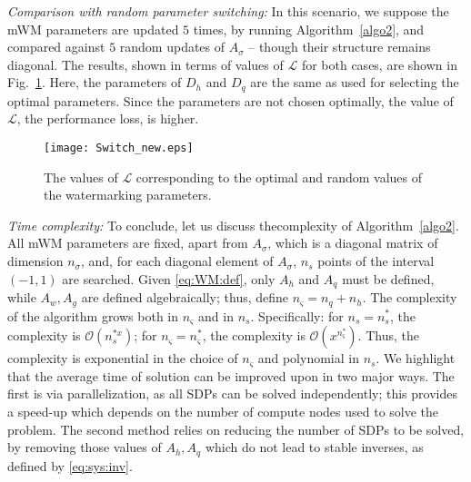 \emph{Comparison with random parameter switching:}
In this scenario, we suppose the mWM parameters are updated $5$ times, by running Algorithm~\ref{algo2}, and compared against $5$ random updates of $A_\sigma$ -- though their structure remains diagonal.
The results, shown in terms of values of $\mathcal L$ for both cases, are shown in Fig.~\ref{fig:switch}.
Here, the parameters of $D_h$ and $D_q$ are the same as used for selecting the optimal parameters. Since the parameters are not chosen optimally, the value of $\mathcal{L}$, the performance loss, is higher. 

\begin{figure}
    \centering
    \texttt{[image: Switch\_new.eps]}
    \caption{The values of $\mathcal{L}$ corresponding to the optimal and random values of the watermarking parameters.}
    \label{fig:switch}
\end{figure}

\emph{Time complexity:}
To conclude, let us discuss thecomplexity of Algorithm~\ref{algo2}. All mWM parameters are fixed, apart from $A_\sigma$, which is a diagonal matrix of dimension $n_\sigma$, and, for each diagonal element of $A_\sigma$, $n_s$ points of the interval $(-1,1)$ are searched.
Given \eqref{eq:WM:def}, only $A_h$ and $A_q$ must be defined, while $A_w, A_g$ are defined algebraically; thus, define $n_\varsigma = n_q + n_h$.
The complexity of the algorithm grows both in $n_\varsigma$ and in $n_s$. Specifically: for $n_s = n_s^*$, the complexity is $\mathcal O(n_s^{*x})$; for $n_\varsigma = n_\varsigma^*$, the complexity is $\mathcal O(x^{n_\varsigma^*})$. Thus, the complexity is exponential in the choice of $n_\varsigma$ and polynomial in $n_s$.
%
We highlight that the average time of solution can be improved upon in two major ways. 
The first is via parallelization, as all SDPs can be solved independently; this provides a speed-up which depends on the number of compute nodes used to solve the problem.
The second method relies on reducing the number of SDPs to be solved, by removing those values of $A_h, A_q$ which do not lead to stable inverses, as defined by \eqref{eq:sys:inv}.

